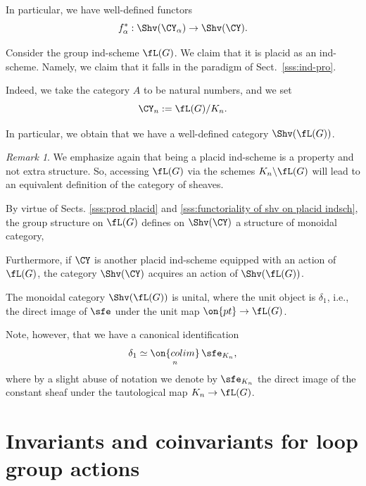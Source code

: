\documentclass[9pt]{amsart}
\theoremstyle{definition}
\theoremstyle{remark}
\newtheorem{rem}[subsubsection]{Remark}
\newcommand{\secref}[1]{Sect.~\ref{#1}}
\numberwithin{equation}{section}
\begin{document}
\medskip

In particular, we have well-defined functors
$$f_\alpha^*:\Shv(\CY_\alpha)\to \Shv(\CY).$$


\sssec{}

Consider the group ind-scheme $\fL(G)$. We claim that it is placid as an ind-scheme. Namely, we claim
that it falls in the paradigm of \secref{sss:ind-pro}. 

\medskip

Indeed, we take the category $A$ to be natural numbers, and we set
$$\CY_n:=\fL(G)/K_n.$$

\sssec{} \label{sss:sheaves on loop group}

In particular, we obtain that we have a well-defined category $\Shv(\fL(G))$.

\begin{rem}
We emphasize again that being a placid ind-scheme is a property and not extra structure.
So, accessing $\fL(G)$ via the schemes $K_n\backslash \fL(G)$ will lead to an equivalent
definition of the category of sheaves.
\end{rem} 

\sssec{}   \label{sss:loop group acting}

By virtue of Sects. \ref{sss:prod placid} and \ref{sss:functoriality of shv on placid indsch}, the group structure on $\fL(G)$
defines on $\Shv(\CY)$ a structure of monoidal category,

\medskip

Furthermore, if $\CY$ is another placid ind-scheme equipped with an action of $\fL(G)$, the 
category $\Shv(\CY)$ acquires an action of $\Shv(\fL(G))$. 

\sssec{}

The monoidal category $\Shv(\fL(G))$ is unital, where the unit object is $\delta_1$, i.e., the direct image 
of $\sfe$ under the unit map $\on{pt}\to \fL(G)$.  

\medskip

Note, however, that we have a canonical identification
\begin{equation} \label{e:delta as colim}
\delta_1\simeq \underset{n}{\on{colim}}\, \sfe_{K_n},
\end{equation} 
where by a slight abuse of notation we denote by $\sfe_{K_n}$ the direct image
of the constant sheaf under the tautological map $K_n\to \fL(G)$. 

\section{Invariants and coinvariants for loop group actions}  \label{s:loop coinv}
\end{document}
